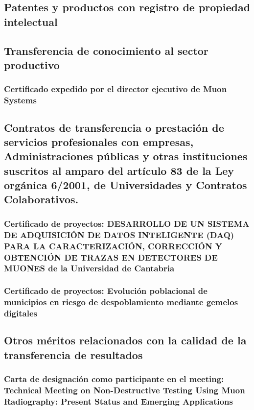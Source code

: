 \documentclass[a4paper, 11pt, twoside, openright]{report}
\begin{document}
\subsection{Patentes y productos con registro de propiedad intelectual}

\subsection{Transferencia de conocimiento al sector productivo}

\subsubsection{Certificado expedido por el director ejecutivo de Muon Systems}


\subsection{Contratos de transferencia o prestación de servicios profesionales con empresas, Administraciones públicas y otras 	instituciones suscritos al amparo del artículo 83 de la Ley orgánica 6/2001, de Universidades y Contratos Colaborativos.}

\subsubsection{Certificado de proyectos: DESARROLLO DE UN SISTEMA DE ADQUISICIÓN DE DATOS INTELIGENTE (DAQ) PARA LA CARACTERIZACIÓN, CORRECCIÓN Y OBTENCIÓN DE TRAZAS EN DETECTORES DE MUONES de la Universidad de Cantabria}


\subsubsection{Certificado de proyectos: Evolución poblacional de municipios en riesgo de despoblamiento mediante gemelos digitales}



\subsection{Otros méritos relacionados con la calidad de la transferencia de resultados}

\subsubsection{Carta de designación como participante en el meeting: Technical Meeting on Non-Destructive Testing Using Muon Radiography: Present Status and Emerging Applications}

\end{document}
